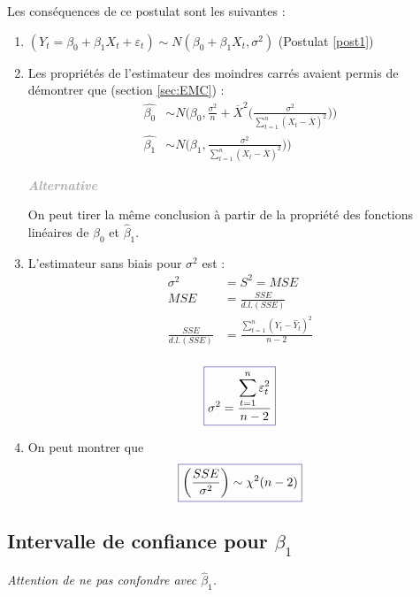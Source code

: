 \documentclass[11pt,french]{report}
\newenvironment{moreInfo}[1]
	{\begin{mdframed}
	\textcolor{darkgray}{\huge \raisebox{-3.5pt}{\faInfo} 
	\hspace{0.5cm} \large\bfseries #1}\\[5pt]
	\normalsize
	\makebox[0.1\textwidth][l]{}	
	\begin{minipage}{10cm}}
	{	\end{minipage}
	\end{mdframed}}
\begin{document}
Les conséquences de ce postulat sont les suivantes :
\begin{enumerate}
\item $(Y_t = \beta_0 + \beta_1X_t + \varepsilon_t) \sim N(\beta_0 + \beta_1X_t, \sigma^2)$ (Postulat \ref{post1})
\item Les propriétés de l'estimateur des moindres carrés avaient permis de démontrer que (section \ref{sec:EMC}) :
	\begin{align*}
	     \hat{\beta_0} &\sim N\Bigg(\beta_0, \frac{\sigma^2}{n}  + \overline{X}^2 \bigg(\frac{\sigma^2}{\displaystyle\sum_{t=1}^n (X_t - \overline{X})^2}\bigg)\Bigg) \\
	     \hat{\beta_1} &\sim N\Bigg(\beta_1, \frac{\sigma^2}{\displaystyle\sum_{t=1}^n(X_t - \overline{X})^2})\Bigg)
	\end{align*}
	
\begin{moreInfo}{\color{Gray}\emph{Alternative}
     \color{black}}
	On peut tirer la même conclusion à partir de la propriété des fonctions linéaires de $\hat{\beta}_0$ et $\hat{\beta}_1$.
\end{moreInfo}

\item L'estimateur sans biais pour $\sigma^2$ est :
\begin{align*}
\sigma^2 &= S^2 = MSE \\
MSE &= \frac{SSE}{d.l.(SSE)} \\
\frac{SSE}{d.l.(SSE)} &= \frac{\displaystyle\sum_{t=1}^n (Y_t - \hat{Y}_t)^2}{n-2} \\
\end{align*}

\begin{equation}
\label{eq:s2}
\color{Blue}
\boxed{\color{black}
\sigma^2 = \frac{\displaystyle\sum_{t=1}^n \varepsilon_t^2}{n-2}}
\end{equation}

\item On peut montrer que 
\begin{equation}
\label{eq:ssesigma}
\color{Blue}
\boxed{\color{black}
\bigg(\frac{SSE}{\sigma^2}\bigg) \sim \chi^2(n - 2) }
\end{equation}
\end{enumerate}

\subsection{Intervalle de confiance pour $\beta_1$}
\emph{Attention de ne pas confondre avec $\hat{\beta}_1$.}
\end{document}

